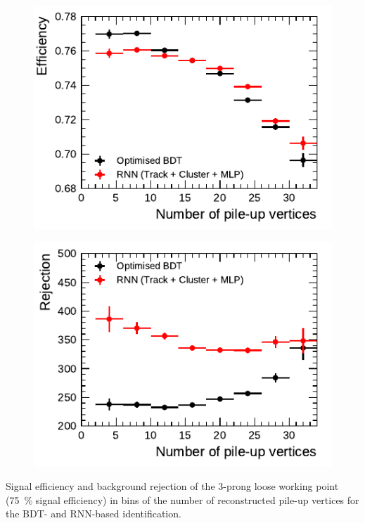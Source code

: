 \vspace*{2em}

\noindent
\begin{minipage}{\textwidth}
  \captionsetup{type=figure}
  \centering
  \begin{subfigure}[t]{0.48\textwidth}
    \centering
    \includegraphics{./figures/rnn/combined/pileup/rnn_loose_sig_3p.pdf}
  \end{subfigure}\hfill
  \begin{subfigure}[t]{0.48\textwidth}
    \centering
    \includegraphics{./figures/rnn/combined/pileup/rnn_loose_bkg_3p.pdf}
  \end{subfigure}
  \caption[Pile-up dependency of the BDT- and RNN-based identification
  (3-prong)]{Signal efficiency and background rejection of the 3-prong loose
    working point (\SI{75}{\percent} signal efficiency) in bins of the number of
    reconstructed pile-up vertices for the BDT- and RNN-based identification.}
\end{minipage}

